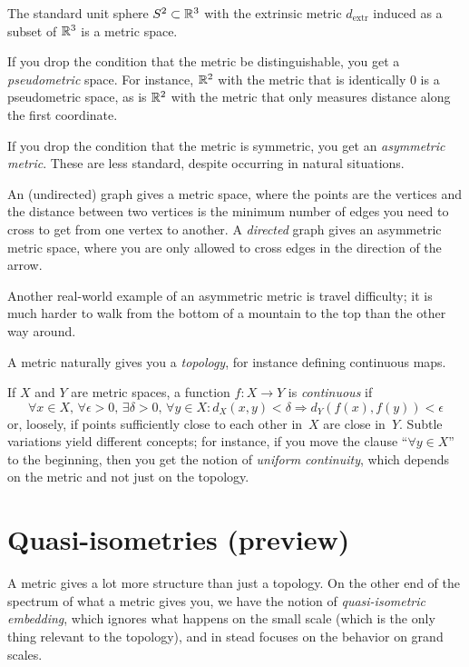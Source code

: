 \documentclass[12pt]{amsart}
\begin{document}
\begin{example}
  The standard unit sphere $S^2 \subset \mathbb R^3$ with the extrinsic
  metric $d_{\text{extr}}$ induced
  as a subset of $\mathbb R^3$ is a metric space.
\end{example}

If you drop the condition that the metric be distinguishable, you get
a \emph{pseudometric} space. For instance, $\mathbb R^2$ with the metric
that is identically $0$ is a pseudometric space, as is $\mathbb R^2$ with
the metric that only measures distance along the first coordinate.

If you drop the condition that the metric is symmetric, you get an
\emph{asymmetric metric}. These are less standard, despite occurring in
natural situations.

\begin{example}
  An (undirected) graph gives a metric space, where the points are the
  vertices and the distance between two vertices is the minimum number
  of edges you need to cross to get from one vertex to another. A
  \emph{directed} graph gives an asymmetric metric space, where you
  are only allowed to cross edges in the direction of the arrow.
\end{example}

Another real-world example of an asymmetric metric is travel
difficulty; it is much harder to walk from the bottom of a mountain to
the top than the other way around.

A metric naturally gives you a \emph{topology}, for instance defining
continuous maps.
\begin{definition}
  If $X$ and $Y$ are metric spaces, a function $f \colon X \to Y$ is
  \emph{continuous} if
  \[
  \forall x \in X, \,\forall \epsilon > 0,\,
  \exists \delta > 0,\,\forall y \in X\colon
  d_X(x,y) < \delta \Rightarrow d_Y(f(x),f(y)) < \epsilon
  \]
  or, loosely, if points sufficiently close to each other in~$X$ are
  close in~$Y$. Subtle variations yield different concepts; for
  instance, if you move the clause ``$\forall y \in X$'' to the
  beginning, then you get the notion of \emph{uniform continuity},
  which depends on the metric and not just on the topology.
\end{definition}

\section{Quasi-isometries (preview)}
\label{sec:quasi-isom-1}
A metric gives a lot more structure than just a topology. On the other
end of the spectrum of what a metric gives you, we have the notion of
\emph{quasi-isometric embedding}, which ignores what happens on the
small scale (which is the only thing relevant to the topology), and in
stead focuses on the behavior on grand scales.
\end{document}

